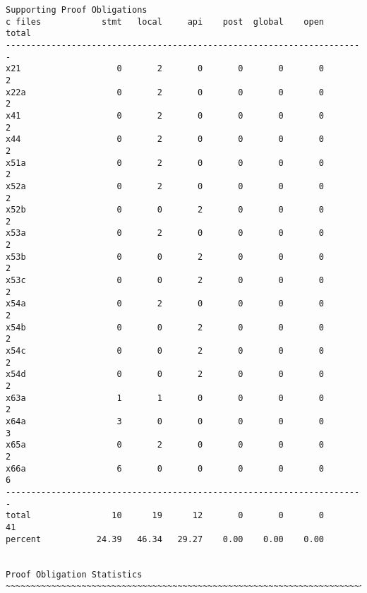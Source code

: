 \documentclass[11pt]{article}
\begin{document}
\begin{scriptsize}
\begin{verbatim}
Supporting Proof Obligations
c files            stmt   local     api    post  global    open   total
-----------------------------------------------------------------------
x21                   0       2       0       0       0       0       2
x22a                  0       2       0       0       0       0       2
x41                   0       2       0       0       0       0       2
x44                   0       2       0       0       0       0       2
x51a                  0       2       0       0       0       0       2
x52a                  0       2       0       0       0       0       2
x52b                  0       0       2       0       0       0       2
x53a                  0       2       0       0       0       0       2
x53b                  0       0       2       0       0       0       2
x53c                  0       0       2       0       0       0       2
x54a                  0       2       0       0       0       0       2
x54b                  0       0       2       0       0       0       2
x54c                  0       0       2       0       0       0       2
x54d                  0       0       2       0       0       0       2
x63a                  1       1       0       0       0       0       2
x64a                  3       0       0       0       0       0       3
x65a                  0       2       0       0       0       0       2
x66a                  6       0       0       0       0       0       6
-----------------------------------------------------------------------
total                10      19      12       0       0       0      41
percent           24.39   46.34   29.27    0.00    0.00    0.00


Proof Obligation Statistics
~~~~~~~~~~~~~~~~~~~~~~~~~~~~~~~~~~~~~~~~~~~~~~~~~~~~~~~~~~~~~~~~~~~~~~~~~~~~~~~~


\end{verbatim}
\end{scriptsize}
\end{document}
